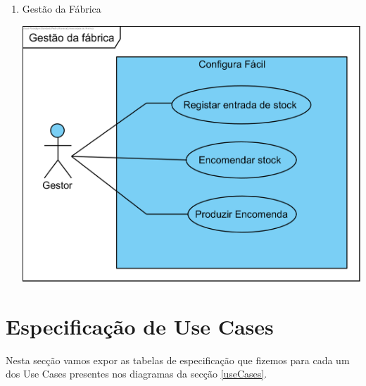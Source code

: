 \documentclass[11pt]{article} %
\begin{document}
\begin{enumerate}
\begin{center}
		\end{center}
	\item Gestão da Fábrica
		\begin{center}
 			\includegraphics[]{Gestao_da_fabrica.png}
		\end{center}
\end{enumerate}

\newpage
\section{Especificação de Use Cases}
Nesta secção vamos expor as tabelas de especificação que fizemos para cada um dos Use Cases presentes nos diagramas da secção \ref{useCases}.
\end{document}
